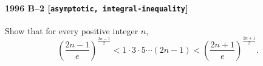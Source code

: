 \paragraph{1996 B--2 \textnormal{[\texttt{asymptotic, integral-inequality}]}}
Show that for every positive integer $n$,
\[
\left( \frac{2n-1}{e} \right)^{\frac{2n-1}{2}} < 1 \cdot 3 \cdot 5
\cdots (2n-1) < \left( \frac{2n+1}{e} \right)^{\frac{2n+1}{2}}.
\]
